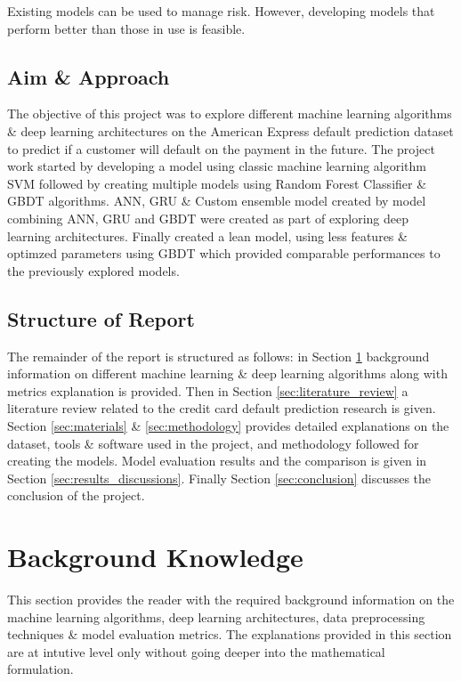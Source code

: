 \documentclass[twoside,11pt,a4paper]{article}
\begin{document}
Existing models can be used to manage risk. However, developing models that perform better than those in use is feasible.

\subsection{Aim \& Approach}
The objective of this project was to explore different machine learning algorithms \& deep learning architectures on the American Express default prediction dataset\citep{amex-default-prediction-dataset} to predict if a customer will default on the payment in the future. The project work started by developing a model using classic machine learning algorithm \acf{SVM} followed by creating multiple models using Random Forest Classifier \& \acf{GBDT} algorithms. \acf{ANN}, \acf{GRU} \& Custom ensemble model created by model combining \acs{ANN}, \acs{GRU} and \acs{GBDT} were created as part of exploring deep learning architectures. Finally created a lean model, using less features \& optimzed parameters using \acs{GBDT} which provided comparable performances to the previously explored models.

\subsection{Structure of Report}
The remainder of the report is structured as follows: in Section \ref{sec:background_knowledge} background information on different machine learning \& deep learning algorithms along with metrics explanation is provided. Then in Section \ref{sec:literature_review} a literature review related to the credit card default prediction research is given. Section \ref{sec:materials} \& \ref{sec:methodology} provides detailed explanations on the dataset, tools \& software used in the project, and methodology followed for creating the models. Model evaluation results and the comparison is given in Section \ref{sec:results_discussions}. Finally Section \ref{sec:conclusion} discusses the conclusion of the project. 

\section{Background Knowledge} \label{sec:background_knowledge}
This section provides the reader with the required background information on the machine learning algorithms, deep learning architectures, data preprocessing techniques \& model evaluation metrics. The explanations provided in this section are at intutive level only without going deeper into the mathematical formulation.
\end{document}
